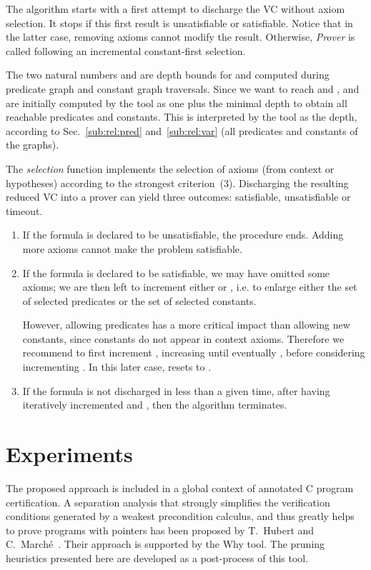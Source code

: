 \documentclass{acm_proc_article-sp}
\theoremstyle{nonumberplain}
\begin{document}
The algorithm starts with a first attempt to discharge the VC 
without axiom selection. It stops if this first 
result is unsatisfiable or satisfiable. Notice that in the latter
case, removing axioms cannot modify the result.
Otherwise, \textit{Prover} is called following an incremental
constant-first selection.

The two natural numbers  and  are depth 
bounds for  and  computed during predicate graph
and constant graph traversals. Since we want to reach  and ,  
 and  are initially computed by the tool as
one plus the minimal depth to obtain all reachable predicates and
constants. This is interpreted by the tool as the  depth, according 
to Sec.~\ref{sub:rel:pred} and~\ref{sub:rel:var} (all predicates and
constants of the graphs).


The \textit{selection} function implements the selection of axioms (from
context or hypotheses) according to the strongest criterion~(3).
Discharging the resulting reduced VC into a prover
can yield three outcomes: satisfiable, unsatisfiable or timeout.


\begin{enumerate}
\item If the formula is declared to be unsatisfiable, the procedure
  ends. Adding more axioms cannot make the problem
  satisfiable. 
\vspace*{5pt}

\item If the formula is declared to be  satisfiable, we may have
omitted some axioms; we are then left to increment either  or
, i.e. to enlarge either the set of selected predicates 
or the set of selected constants.

However, allowing predicates has a more critical impact than allowing
new constants, since constants do not appear in context axioms.
Therefore we recommend to first increment , increasing  until
eventually , before considering incrementing . In this
later case,  resets to . 
\vspace*{5pt}

\item If the formula is not discharged in less than a given time,
  after having iteratively incremented  and , then the
  algorithm terminates.
\end{enumerate}





\section{Experiments}\label{sec:strat}
The proposed approach is included in a global context of annotated C
program certification. A separation analysis that strongly simplifies
the verification conditions generated by a weakest precondition
calculus, and thus greatly helps to prove programs with pointers has
been proposed by T.~Hubert and C.~March{\'e}~\cite{hubert07hav}. Their
approach is supported by the Why tool. The pruning heuristics presented
here are developed as a post-process of this tool.
\end{document}

